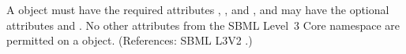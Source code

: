 A \Unit object must have the required attributes ,
,  and , and may have the
optional attributes   and .  No other
attributes from the SBML Level~3 Core namespace are permitted on a \Unit
object.  (References: SBML L3V2 .)
